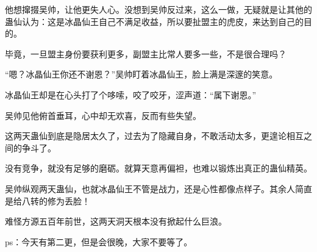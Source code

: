 \begin{this_body}
他想撺掇吴帅，让他更失人心。没想到吴帅反过来，这么一做，无疑就是让其他的蛊仙认为：这是冰晶仙王自己不满足收益，所以要扯盟主的虎皮，来达到自己的目的。

毕竟，一旦盟主身份要获利更多，副盟主比常人要多一些，不是很合理吗？

“嗯？冰晶仙王你还不谢恩？”吴帅盯着冰晶仙王，脸上满是深邃的笑意。

冰晶仙王却是在心头打了个哆嗦，咬了咬牙，涩声道：“属下谢恩。”

吴帅见他俯首垂耳，心中却无欢喜，反而有些失望。

这两天蛊仙到底是隐居太久了，过去为了隐藏自身，不敢活动太多，更遑论相互之间的争斗了。

没有竞争，就没有足够的磨砺。就算天意再偏袒，也难以锻炼出真正的蛊仙精英。

吴帅纵观两天蛊仙，也就冰晶仙王不管是战力，还是心性都像点样子。其余人简直是给八转的修为丢脸！

难怪方源五百年前世，这两天洞天根本没有掀起什么巨浪。

ps：今天有第二更，但是会很晚，大家不要等了。

\end{this_body}

